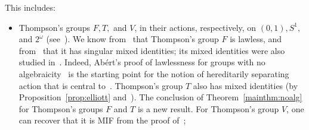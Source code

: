 \documentclass{article}
\theoremstyle{remark}
\theoremstyle{definition}
\begin{document}
\begin{itemize}
This includes:
\begin{itemize}
\item Thompson's groups $F, T,$ and $V$, %
in their actions, respectively, on $(0,1), S^1,$ and $2^\omega$ (see~\cite{cannon1996introductory}). 
We know from~\cite{brin1985groups} that Thompson's group $F$ is lawless, and from~\cite{zarzycki2010limits} that it has singular mixed identities; its mixed identities were also studied in~\cite{slanina2019laws, ivanov2025mixed}. Indeed, Ab\'{e}rt's proof of lawlessness  for groups with no algebraicity~\cite{abert2005group} is the starting point for the notion of hereditarily separating action that is central to~\cite{ivanov2025mixed}.  Thompson's group $T$ also has mixed identities (by Proposition~\ref{prop:elliott} and~\cite[Theorem 1.2]{elliott2026zariskitopologyhomeomorphismgroups}). The conclusion of Theorem~\ref{mainthm:noalg} for Thompson's groups $F$ and $T$ is a new result. For Thompson's group $V$, one can recover that it is MIF from the proof of~\cite[Theorem 1.3]{elliott2026zariskitopologyhomeomorphismgroups};


\end{itemize}
\end{itemize}
\end{document}
